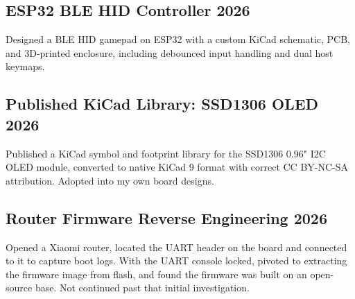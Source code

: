 \documentclass[10pt,a4paper]{article}
\begin{document}
\subsection*{ESP32 BLE HID Controller \hfill 2026}
Designed a BLE HID gamepad on ESP32 with a custom KiCad schematic, PCB, and
3D-printed enclosure, including debounced input handling and dual host keymaps.

\subsection*{Published KiCad Library: SSD1306 OLED \hfill 2026}
Published a KiCad symbol and footprint library for the SSD1306 0.96" I2C OLED
module, converted to native KiCad 9 format with correct CC BY-NC-SA attribution.
Adopted into my own board designs.

\subsection*{Router Firmware Reverse Engineering \hfill 2026}
Opened a Xiaomi router, located the UART header on the board and connected to it
to capture boot logs. With the UART console locked, pivoted to extracting the
firmware image from flash, and found the firmware was built on an open-source
base. Not continued past that initial investigation.
\end{document}
